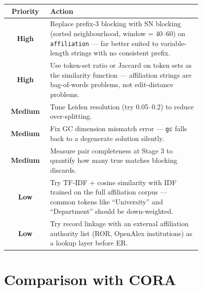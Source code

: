 \documentclass[11pt, a4paper]{article}
\begin{document}
\begin{table}[h!]
\centering
\begin{tabular}{cp{0.78\linewidth}}
\toprule
\textbf{Priority} & \textbf{Action} \\
\midrule
{\color{highprio}\textbf{High}}  & Replace prefix-3 blocking with SN blocking (sorted neighbourhood, window = 40--60) on \texttt{affiliation} --- far better suited to variable-length strings with no consistent prefix. \\[4pt]
{\color{highprio}\textbf{High}}  & Use token-set ratio or Jaccard on token sets as the similarity function --- affiliation strings are bag-of-words problems, not edit-distance problems. \\[4pt]
{\color{medprio}\textbf{Medium}} & Tune Leiden resolution (try 0.05--0.2) to reduce over-splitting. \\[4pt]
{\color{medprio}\textbf{Medium}} & Fix GC dimension mismatch error --- \texttt{gc} falls back to a degenerate solution silently. \\[4pt]
{\color{medprio}\textbf{Medium}} & Measure pair completeness at Stage 3 to quantify how many true matches blocking discards. \\[4pt]
{\color{lowprio}\textbf{Low}}    & Try TF-IDF + cosine similarity with IDF trained on the full affiliation corpus --- common tokens like ``University'' and ``Department'' should be down-weighted. \\[4pt]
{\color{lowprio}\textbf{Low}}    & Try record linkage with an external affiliation authority list (ROR, OpenAlex institutions) as a lookup layer before ER. \\
\bottomrule
\end{tabular}
\end{table}

\section{Comparison with CORA}
\end{document}
